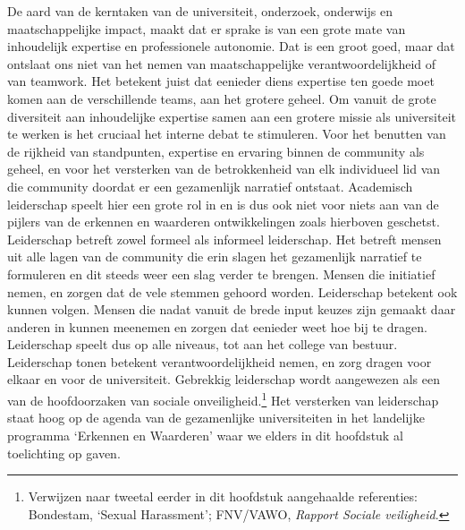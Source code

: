 \documentclass[smallauthor, chapterhaspagenum, nochapterinheader, pagenuminheader,  bigchapnum,medium2, tocpages, garamond, titleinheader]{jote-book}
\begin{document}
	De aard van de kerntaken van de universiteit, onderzoek, onderwijs en maatschappelijke impact, maakt dat er sprake is van een grote mate van inhoudelijk expertise en professionele autonomie. Dat is een groot goed, maar dat ontslaat ons niet van het nemen van maatschappelijke verantwoordelijkheid of van teamwork. Het betekent juist dat eenieder diens expertise ten goede moet komen aan de verschillende teams, aan het grotere geheel. Om vanuit de grote diversiteit aan inhoudelijke expertise samen aan een grotere missie als universiteit te werken is het cruciaal het interne debat te stimuleren. Voor het benutten van de rijkheid van standpunten, expertise en ervaring binnen de community als geheel, en voor het versterken van de betrokkenheid van elk individueel lid van die community doordat er een gezamenlijk narratief ontstaat. Academisch leiderschap speelt hier een grote rol in en is dus ook niet voor niets aan van de pijlers van de erkennen en waarderen ontwikkelingen zoals hierboven geschetst. Leiderschap betreft zowel formeel als informeel leiderschap. Het betreft mensen uit alle lagen van de community die erin slagen het gezamenlijk narratief te formuleren en dit steeds weer een slag verder te brengen. Mensen die initiatief nemen, en zorgen dat de vele stemmen gehoord worden. Leiderschap betekent ook kunnen volgen. Mensen die nadat vanuit de brede input keuzes zijn gemaakt daar anderen in kunnen meenemen en zorgen dat eenieder weet hoe bij te dragen. Leiderschap speelt dus op alle niveaus, tot aan het college van bestuur. Leiderschap tonen betekent verantwoordelijkheid nemen, en zorg dragen voor elkaar en voor de universiteit. Gebrekkig leiderschap wordt aangewezen als een van de hoofdoorzaken van sociale onveiligheid.\footnote{Verwijzen naar tweetal eerder in dit hoofdstuk aangehaalde referenties: Bondestam, ‘Sexual Harassment'; FNV/VAWO, \emph{Rapport Sociale veiligheid}.} Het versterken van leiderschap staat hoog op de agenda van de gezamenlijke universiteiten in het landelijke programma ‘Erkennen en Waarderen' waar we elders in dit hoofdstuk al toelichting op gaven.
\end{document}
